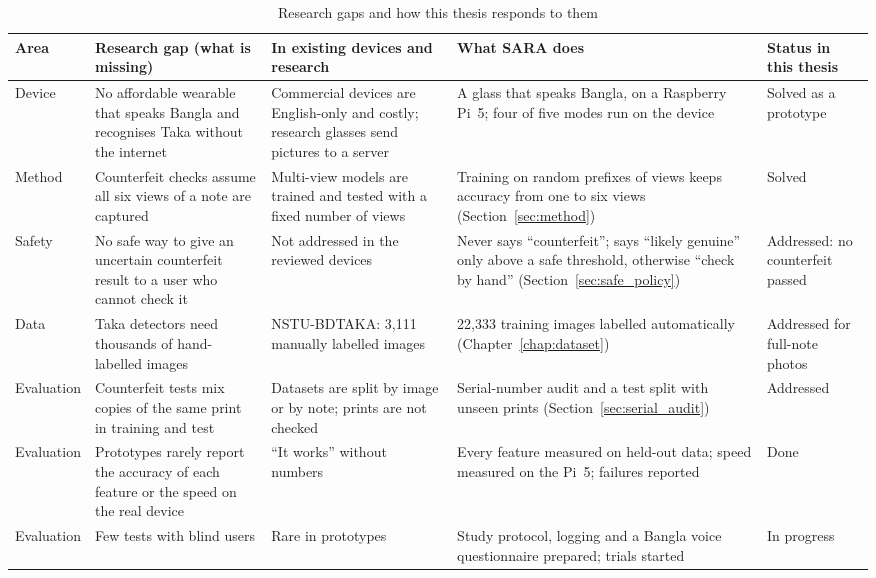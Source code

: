 \begin{table}[!htbp]
\centering
\caption{Research gaps and how this thesis responds to them}
\label{tab:gap}
\small
\begin{tabular}{|L{1.7cm}|L{3.3cm}|L{3.2cm}|L{3.3cm}|L{2.2cm}|}
\hline
\textbf{Area} & \textbf{Research gap (what is missing)} & \textbf{In existing devices and research} & \textbf{What SARA does} & \textbf{Status in this thesis} \\ \hline
Device & No affordable wearable that speaks Bangla and recognises Taka without the internet & Commercial devices are English-only and costly; research glasses send pictures to a server & A glass that speaks Bangla, on a Raspberry Pi~5; four of five modes run on the device & Solved as a prototype \\ \hline
Method & Counterfeit checks assume all six views of a note are captured & Multi-view models are trained and tested with a fixed number of views & Training on random prefixes of views keeps accuracy from one to six views (Section~\ref{sec:method}) & Solved \\ \hline
Safety & No safe way to give an uncertain counterfeit result to a user who cannot check it & Not addressed in the reviewed devices & Never says ``counterfeit''; says ``likely genuine'' only above a safe threshold, otherwise ``check by hand'' (Section~\ref{sec:safe_policy}) & Addressed: no counterfeit passed \\ \hline
Data & Taka detectors need thousands of hand-labelled images & NSTU-BDTAKA: 3,111 manually labelled images & 22,333 training images labelled automatically (Chapter~\ref{chap:dataset}) & Addressed for full-note photos \\ \hline
Evaluation & Counterfeit tests mix copies of the same print in training and test & Datasets are split by image or by note; prints are not checked & Serial-number audit and a test split with unseen prints (Section~\ref{sec:serial_audit}) & Addressed \\ \hline
Evaluation & Prototypes rarely report the accuracy of each feature or the speed on the real device & ``It works'' without numbers & Every feature measured on held-out data; speed measured on the Pi~5; failures reported & Done \\ \hline
Evaluation & Few tests with blind users & Rare in prototypes & Study protocol, logging and a Bangla voice questionnaire prepared; trials started & In progress \\ \hline
\end{tabular}
\end{table}
\FloatBarrier

